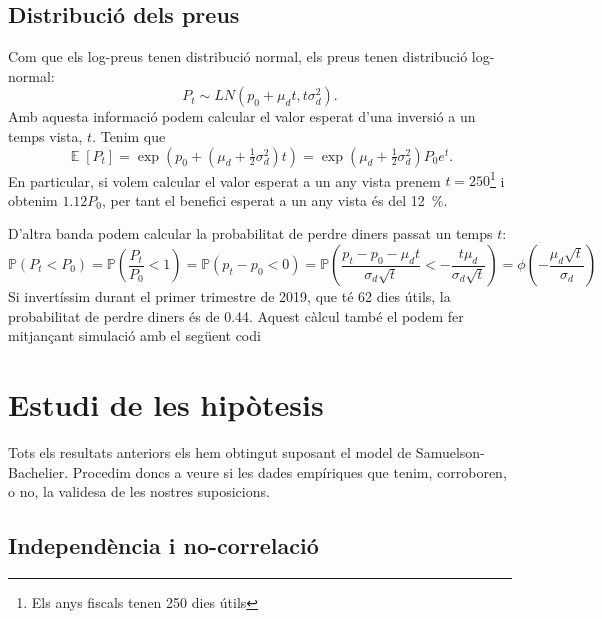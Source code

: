 \documentclass{article}
\numberwithin{table}{section}
\numberwithin{figure}{section}
\numberwithin{equation}{section}
\DeclareMathOperator{\E}{\mathbb{E}}
\renewcommand{\P}{\ensuremath{\mathbb{P}}}
\begin{document}
\subsection{Distribució dels preus}
Com que els log-preus tenen distribució normal, els preus tenen distribució log-normal:
\begin{equation} \label{eqn:distribucio preus}
	P_t \sim LN(p_0 + \mu_d t, t\sigma_d^2).
\end{equation}
Amb aquesta informació podem calcular el valor esperat d'una inversió a un temps vista, \( t \). Tenim que
\begin{equation*}
	\E[P_t] = \exp\left(p_0 + \left(\mu_d + \tfrac{1}{2}\sigma_d^2\right)t\right) = \exp\left(\mu_d + \tfrac{1}{2}\sigma_d^2\right)P_0e^t.
\end{equation*}
En particular, si volem calcular el valor esperat a un any vista prenem \( t = 250 \)\footnote{Els anys fiscals tenen 250 dies útils} i obtenim \( 1.12P_0 \), per tant el benefici esperat a un any vista és del \SI{12}{\percent}.

D'altra banda podem calcular la probabilitat de perdre diners passat un temps \( t \):
\begin{equation*}
	\P(P_t < P_0) = \P\left(\frac{P_t}{P_0} < 1\right) = \P(p_t - p_0 < 0) = \P\left(\frac{p_t - p_0 - \mu_d t}{\sigma_d\sqrt{t}} < -\frac{t\mu_d}{\sigma_d\sqrt{t}}\right) = \phi\left(-\frac{\mu_d \sqrt{t}}{\sigma_d}\right)
\end{equation*}
Si invertíssim durant el primer trimestre de 2019, que té 62 dies útils, la probabilitat de perdre diners és de \num{0.44}. Aquest càlcul també el podem fer mitjançant simulació amb el següent codi


\section{Estudi de les hipòtesis}
Tots els resultats anteriors els hem obtingut suposant el model de Samuelson-Bachelier. Procedim doncs a veure si les dades empíriques que tenim, corroboren, o no, la validesa de les nostres suposicions.

\subsection{Independència i no-correlació}%
\end{document}
